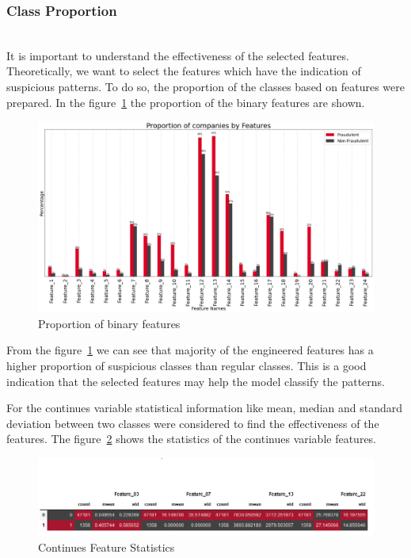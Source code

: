 \subsubsection{Class Proportion}\hspace*{\fill} \\
 It is important to understand the effectiveness of the selected features. Theoretically, we want to select the features which have the indication of suspicious patterns. To do so, the proportion of the classes based on features were prepared. In the figure~\ref{fig:feature proportion} the proportion of the binary features are shown.
\begin{figure}[H]
    \centering
    \includegraphics[width=\linewidth]{figures/feature_proportion.png}
    \caption{Proportion of binary features}
    \label{fig:feature proportion}
\end{figure}

From the figure~\ref{fig:feature proportion} we can see that majority of the engineered features has a higher proportion of suspicious classes than regular classes. This is a good indication that the selected features may help the model classify the patterns. 


For the continues variable statistical information like mean, median and standard deviation between two classes were considered to find the effectiveness of the features. The figure~\ref{fig:Continues Feature Statistics} shows the statistics of the continues variable features. 

\begin{figure}[H]
    \centering
    \includegraphics[width=\linewidth]{figures/feature_proportion_2.PNG}
    \caption{Continues Feature Statistics}
    \label{fig:Continues Feature Statistics}
\end{figure}


